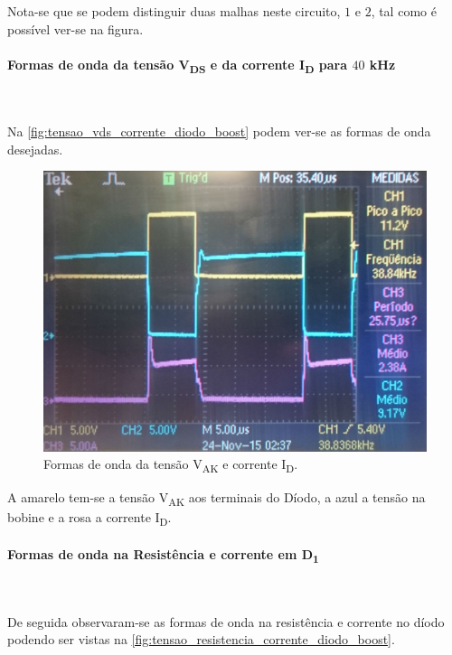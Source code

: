 \documentclass[a4paper,11pt]{article}
\numberwithin{equation}{section}
\begin{document}
Nota-se que se podem distinguir duas malhas neste circuito, $1$ e $2$, tal como é possível ver-se na figura.

\paragraph{Formas de onda da tensão V\textsubscript{DS} e da corrente I\textsubscript{D} para $40$ kHz}\mbox{}\

Na \autoref{fig:tensao_vds_corrente_diodo_boost} podem ver-se as formas de onda desejadas.

\begin{figure}[H]
	\centering
	\includegraphics[keepaspectratio=true, scale=0.13]{img/figs/tensao_vds_corrente_diodo_boost}
	\caption{Formas de onda da tensão V\textsubscript{AK} e corrente I\textsubscript{D}.}
	\label{fig:tensao_vds_corrente_diodo_boost}
	\vspace{-0.8em}
\end{figure}

A amarelo tem-se a tensão V\textsubscript{AK} aos terminais do Díodo, a azul a tensão na bobine e a rosa a corrente I\textsubscript{D}.

\paragraph{Formas de onda na Resistência e corrente em D\textsubscript{1}}\mbox{}\

De seguida observaram-se as formas de onda na resistência e corrente no díodo podendo ser vistas na \autoref{fig:tensao_resistencia_corrente_diodo_boost}.
\end{document}

